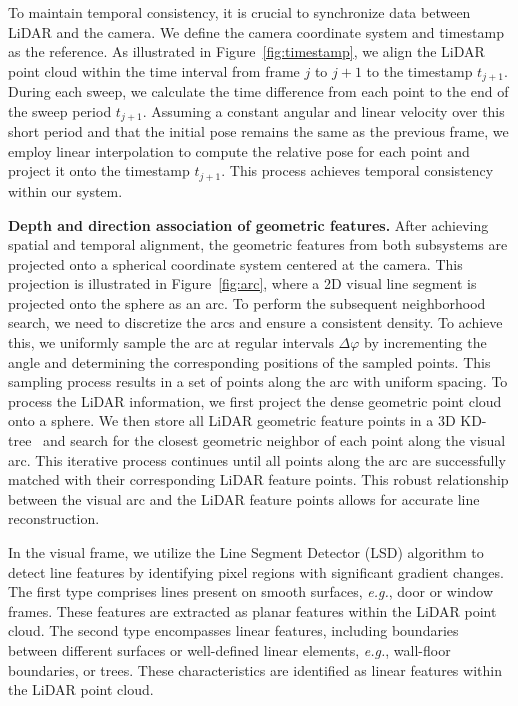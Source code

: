 To maintain temporal consistency, it is crucial to synchronize data between LiDAR and the camera. We define the camera coordinate system and timestamp as the reference. As illustrated in Figure~\ref{fig:timestamp}, we align the LiDAR point cloud within the time interval from frame $j$ to $j+1$ to the timestamp $t_{j+1}$. During each sweep, we calculate the time difference from each point to the end of the sweep period $t_{j+1}$. Assuming a constant angular and linear velocity over this short period and that the initial pose remains the same as the previous frame, we employ linear interpolation to compute the relative pose for each point and project it onto the timestamp $t_{j+1}$. This process achieves temporal consistency within our system.

\noindent\textbf{Depth and direction association of geometric features.} After achieving spatial and temporal alignment, the geometric features from both subsystems are projected onto a spherical coordinate system centered at the camera. This projection is illustrated in Figure~\ref{fig:arc}, where a 2D visual line segment is projected onto the sphere as an arc. To perform the subsequent neighborhood search, we need to discretize the arcs and ensure a consistent density. To achieve this, we uniformly sample the arc at regular intervals $\Delta \varphi$ by incrementing the angle and determining the corresponding positions of the sampled points.
This sampling process results in a set of points along the arc with uniform spacing.
To process the LiDAR information, we first project the dense geometric point cloud onto a sphere. We then store all LiDAR geometric feature points in a 3D KD-tree~\cite{mark2008computational} and search for the closest geometric neighbor of each point along the visual arc. This iterative process continues until all points along the arc are successfully matched with their corresponding LiDAR feature points. This robust relationship between the visual arc and the LiDAR feature points allows for accurate line reconstruction. 

In the visual frame, we utilize the Line Segment Detector (LSD) algorithm to detect line features by identifying pixel regions with significant gradient changes. The first type comprises lines present on smooth surfaces, \textit{e.g.}, door or window frames. These features are extracted as planar features within the LiDAR point cloud. The second type encompasses linear features, including boundaries between different surfaces or well-defined linear elements, \textit{e.g.}, wall-floor boundaries, or trees. These characteristics are identified as linear features within the LiDAR point cloud.

